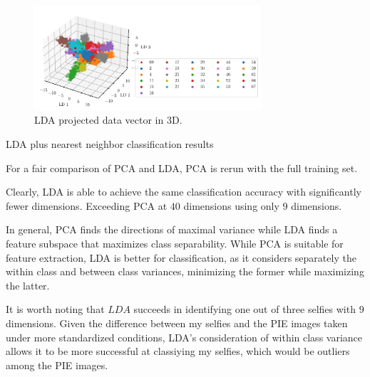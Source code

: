 \documentclass[a4paper]{exam}
\begin{document}
\begin{questions}
    \begin{figure}[ht]
        \centering
        \includegraphics[width=0.75\textwidth]{lda_3d}
        \caption{LDA projected data vector in 3D.}
        \label{fig:lda_3d}
    \end{figure}

    \clearpage\question LDA plus nearest neighbor classification results

    For a fair comparison of PCA and LDA, PCA is rerun with the full training set.

    Clearly, LDA is able to achieve the same classification accuracy with significantly fewer dimensions.
    Exceeding PCA at $40$ dimensions using only $9$ dimensions.

    In general, PCA finds the directions of maximal variance while LDA finds a feature subspace that maximizes class separability.
    While PCA is suitable for feature extraction, LDA is better for classification, as it considers separately the within class and between class variances, minimizing the former while maximizing the latter.

    It is worth noting that $LDA$ succeeds in identifying one out of three selfies with $9$ dimensions.
    Given the difference between my selfies and the PIE images taken under more standardized conditions,
    LDA's consideration of within class variance allows it to be more successful at classiying my selfies,
    which would be outliers among the PIE images.


\end{questions}
\end{document}
